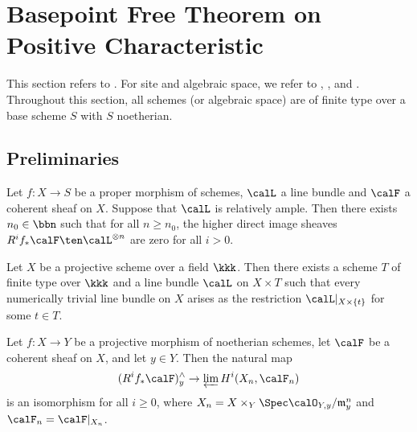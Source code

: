 \section{Basepoint Free Theorem on Positive Characteristic}

    This section refers to \cite{Kee99}.
    For site and algebraic space, we refer to \cite{Knu71}, \cite{Art70}, \cite{Stacks} and \cite{FGA05}.
    Throughout this section, all schemes (or algebraic space) are of finite type over a base scheme \(S\) with \(S\) noetherian.

\subsection{Preliminaries}

    \begin{theorem}\label{thm:Serre_vanishing_relative_setting}
        Let \(f:X \to S\) be a proper morphism of schemes, \(\calL\) a line bundle and \(\calF\) a coherent sheaf on \(X\).
        Suppose that \(\calL\) is relatively ample.
        Then there exists \(n_0 \in \bbn\) such that for all \(n \geq n_0\), the higher direct image sheaves \(R^if_* \calF \ten \calL^{\otimes n}\) are zero for all \(i > 0\).
    \end{theorem}

    \begin{theorem}\label{thm:numerically_trivial_line_bundle_on_projective_scheme}
        Let \(X\) be a projective scheme over a field \(\kkk\).
        Then there exists a scheme \(T\) of finite type over \(\kkk\) and a line bundle \(\calL\) on \(X \times T\) 
        such that every numerically trivial line bundle on \(X\) arises as the restriction \(\calL|_{X \times \{t\}}\) for some \(t \in T\).
    \end{theorem}

        \begin{theorem}\label{thm:formal_functions}
            Let \(f: X \to Y\) be a projective morphism of noetherian schemes, let \(\calF\) be a coherent sheaf on \(X\), and let \(y \in Y\).
            Then the natural map
            \[
                (R^i f_* \calF)^{\wedge}_y \to \varprojlim H^i(X_n, \calF_n)
            \]
            is an isomorphism for all \(i \geq 0\), where \(X_n = X \times_Y \Spec \calO_{Y,y}/\mathfrak{m}_y^{n}\) and \(\calF_n = \calF|_{X_n}\).
        \end{theorem}

